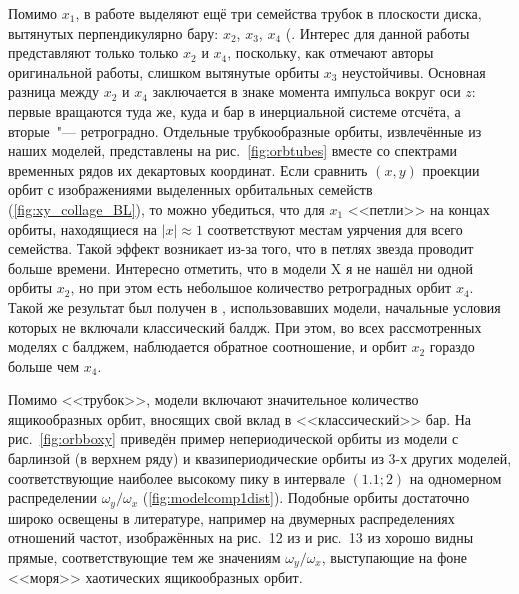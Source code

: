 \documentclass[tikz]{trlnotes}
\begin{document}
Помимо $x_1$, в работе \citet{contopoulos1980a} выделяют ещё три семейства трубок в плоскости диска, вытянутых перпендикулярно бару: $x_2$, $x_3$, $x_4$ (\cite[стр.~185]{2008gady.book.....B}. Интерес для данной работы представляют только только $x_2$ и $x_4$, поскольку, как отмечают авторы оригинальной работы, слишком вытянутые орбиты $x_3$ неустойчивы. Основная разница между $x_2$ и $x_4$ заключается в знаке момента импульса вокруг оси $z$: первые
вращаются туда же, куда и бар в инерциальной системе отсчёта, а вторые~"--- ретроградно. Отдельные трубкообразные орбиты,
извлечённые из наших моделей, представлены на рис.~\ref{fig:orbtubes} вместе со спектрами временных рядов их декартовых координат. 
Если сравнить $(x,y)$ проекции орбит с изображениями выделенных орбитальных семейств (\ref{fig:xy_collage_BL}), то можно убедиться, что для $x_1$ <<петли>> на концах орбиты, находящиеся на $|x|\approx 1$ соответствуют местам уярчения для всего семейства. Такой эффект возникает из-за того, что в петлях звезда проводит больше времени.
Интересно отметить, что в модели X я не нашёл ни одной орбиты $x_2$, но при этом есть небольшое количество ретроградных орбит $x_4$. Такой же результат был получен в \citet{valluri2016,voglis2007}, использовавших модели, начальные условия которых не включали классический балдж. При этом, во всех рассмотренных моделях с балджем, наблюдается обратное соотношение, и орбит $x_2$ гораздо больше чем $x_4$.

Помимо <<трубок>>, модели включают значительное количество ящикообразных орбит, вносящих свой вклад в <<классический>> бар. На рис.~\ref{fig:orbboxy} приведён пример непериодической орбиты из модели с барлинзой (в верхнем ряду) и квазипериодические орбиты из 3-х других моделей, соответствующие наиболее высокому пику в интервале $(1.1;2)$ на одномерном распределении $ω_y/ω_x$ (\ref{fig:modelcomp1dist}).
Подобные орбиты достаточно широко освещены в литературе, например на двумерных распределениях отношений частот, изображённых
на рис.~12 из \cite{gajda2016} и рис.~13 из \cite{valluri2016} хорошо видны прямые, соответствующие тем же
значениям $ω_y/ω_x$, выступающие на фоне <<моря>> хаотических  ящикообразных орбит.
\end{document}
